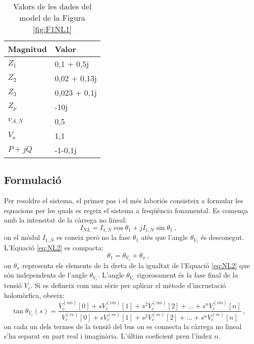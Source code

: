 \begin{table}[!htb]
    \begin{center}
    \begin{tabular}{ll}
    \hline
    Magnitud & Valor\\
    \hline
    \hline
    $Z_1$ & 0,1 + 0,5j\\
    $Z_2$ & 0,02 + 0,13j\\
    $Z_3$ & 0,023 + 0,1j\\
    $Z_p$ & -10j\\
    $v_{A,N}$ & 0,5\\
    $V_a$ & 1,1\\
    $P+jQ$ & -1-0,1j\\
    \hline 
    \end{tabular}
    \caption{Valors de les dades del model de la Figura \ref{fig:F1NL1}}
    \label{tab:NL1}
    \end{center}
  \end{table}

\subsection{Formulació}
Per resoldre el sistema, el primer pas i el més laboriós consisteix a formular les equacions per les quals es regeix el sistema a freqüència fonamental. Es comença amb la intensitat de la càrrega no lineal:
\begin{equation}
    I_{NL}=I_{1,N}\cos\theta_1+jI_{1,N}\sin\theta_1\ ,
    \label{eq:Fx1}
\end{equation}
on el mòdul $I_{1,N}$ es coneix però no la fase $\theta_1$ atès que l'angle $\theta_{V_c}$ és desconegut. L'Equació \ref{eq:NL2} es compacta:
\begin{equation}
    \theta_1=\theta_{V_c}+\theta_x\ ,
    \label{eq:Fx2}
\end{equation}
on $\theta_x$ representa els elements de la dreta de la igualtat de l'Equació \ref{eq:NL2} que són independents de l'angle $\theta_{V_c}$. L'angle $\theta_{V_c}$ rigorosament és la fase final de la tensió $V_c$. Si es defineix com una sèrie per aplicar el mètode d'incrustació holomòrfica, obeeix:
\begin{equation}
    \tan\theta_{V_c}(s)=\frac{V_c^{(im)}[0]+sV_c^{(im)}[1]+s^2V_c^{(im)}[2]+...+s^nV_c^{(im)}[n]}{V_c^{(re)}[0]+sV_c^{(re)}[1]+s^2V_c^{(re)}[2]+...+s^nV_c^{(re)}[n]}\ ,
    \label{eq:Fx3}
\end{equation}
on cada un dels termes de la tensió del bus on es connecta la càrrega no lineal s'ha separat en part real i imaginària. L'últim coeficient pren l'índex $n$. 


